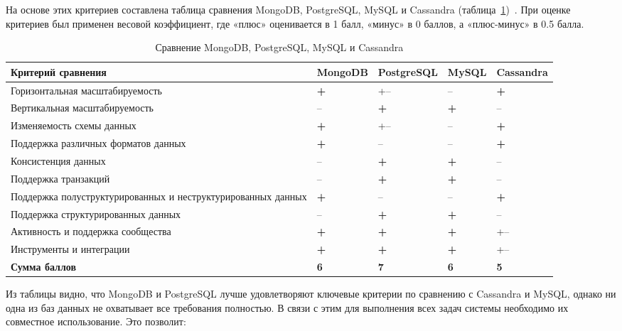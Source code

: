 На основе этих критериев составлена таблица сравнения MongoDB, PostgreSQL, MySQL и Cassandra (таблица~\ref{tab:comparison})~\cite{data-aggreg, ran}.
При оценке критериев был применен весовой коэффициент, где «плюс» оценивается в 1 балл, «минус» в 0 баллов, а «плюс-минус» в 0.5 балла.
\begin{table}[h] 
    \centering 
    \caption{Сравнение MongoDB, PostgreSQL, MySQL и Cassandra} 
    \label{tab:comparison} 
    \begin{tabular}{|>{\centering\arraybackslash}p{4cm}|>{\centering\arraybackslash}p{2.5cm}|>{\centering\arraybackslash}p{2.5cm}|>{\centering\arraybackslash}p{2.5cm}|>{\centering\arraybackslash}p{2.5cm}|} 
        \hline 
        \textbf{Критерий сравнения} & \textbf{MongoDB} & \textbf{PostgreSQL} & \textbf{MySQL} & \textbf{Cassandra} \\ \hline 
        Горизонтальная масштабируемость & \textbf{+} & +– & – & \textbf{+} \\ \hline 
        Вертикальная масштабируемость & – & \textbf{+} & \textbf{+} & – \\ \hline 
        Изменяемость схемы данных & \textbf{+} & +– & – & \textbf{+} \\ \hline 
        Поддержка различных форматов данных & \textbf{+} & – & – & \textbf{+} \\ \hline 
        Консистенция данных & – & \textbf{+} & \textbf{+} & – \\ \hline 
        Поддержка транзакций & – & \textbf{+} & \textbf{+} & – \\ \hline 
        Поддержка полуструктурированных и неструктурированных данных & \textbf{+} & – & – & \textbf{+} \\ \hline 
        Поддержка структурированных данных & – & \textbf{+} & \textbf{+} & – \\ \hline 
        Активность и поддержка сообщества & \textbf{+} & \textbf{+} & \textbf{+} & +– \\ \hline 
        Инструменты и интеграции & \textbf{+} & \textbf{+} & \textbf{+} & +– \\ \hline 
        \textbf{Сумма баллов} & \textbf{6} & \textbf{7} & \textbf{6} & \textbf{5} \\ \hline 
    \end{tabular} 
\end{table}
\clearpage

Из таблицы видно, что MongoDB и PostgreSQL лучше удовлетворяют ключевые критерии по сравнению с Cassandra и MySQL, однако ни одна из баз данных не охватывает все требования полностью. 
В связи с этим для выполнения всех задач системы необходимо их совместное использование.
Это позволит:

